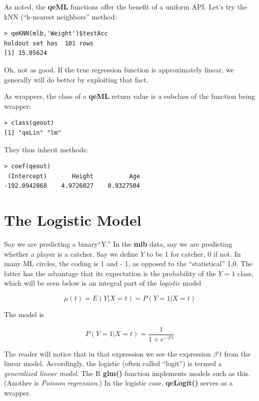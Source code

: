 As noted, the \textbf{qeML} functions offer the benefit of a uniform
API.  Let's try the kNN (``k-nearest neighbors'' method:

\begin{lstlisting}
> qeKNN(mlb,'Weight')$testAcc
holdout set has  101 rows
[1] 15.05624
\end{lstlisting}

Oh, not as good.  If the true regression function is approximately
linear, we generally will do better by exploiting that fact.

As wrappers, the class of a \textbf{qeML} return value is a subclass of
the function being wrapper:

\begin{lstlisting}
> class(qeout)
[1] "qeLin" "lm"   
\end{lstlisting}

They thus inherit methods:

\begin{lstlisting}
> coef(qeout)
 (Intercept)       Height          Age 
-192.0942868    4.9726027    0.9327504 
\end{lstlisting}

\section{The Logistic Model}

Say we are predicting a binary``Y.''  In the \textbf{mlb} data, say we
are predicting whether a player is a catcher.  Say we define $Y$ to be 1
for catcher, 0 if not.  In many ML circles, the coding is 1 and - 1, as
opposed to the ``statistical'' 1,0.  The latter has the advantage that
its expectation is the probability of the $Y = 1$ class, which will be
seen below is an integral part of the \textit{logistic} model

\begin{equation}
\mu(t) = E(Y | X= t) = P(Y = 1 | X = t)
\end{equation}

The model is

\begin{equation}
\label{logit}
P(Y = 1 | X = t) =
\frac{1}{1 + e^{-\beta' t}}
\end{equation}

The reader will notice that in that expression we see the expression
$\beta't$ from the linear model.  Accordingly, the logistic (often
called ``logit'') is termed a \textit{generalized linear model}.
The R \textbf{glm()} function implements models such as this.  (Another
is \textit{Poisson regression}.)  In the logistic case,
\textbf{qeLogit()} serves as a wrapper.

